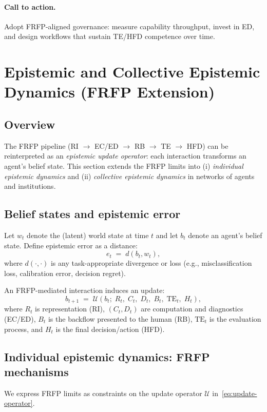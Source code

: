 \paragraph{Call to action.}
Adopt FRFP-aligned governance: measure capability throughput, invest in ED, and design workflows that sustain TE/HFD competence over time.
\section{Epistemic and Collective Epistemic Dynamics (FRFP Extension)}
\label{sec:epistemics}

\subsection{Overview}
The FRFP pipeline (RI $\rightarrow$ EC/ED $\rightarrow$ RB $\rightarrow$ TE $\rightarrow$ HFD) can be reinterpreted as an \emph{epistemic update operator}: each interaction transforms an agent's belief state. This section extends the FRFP limits into (i) \emph{individual epistemic dynamics} and (ii) \emph{collective epistemic dynamics} in networks of agents and institutions.

\subsection{Belief states and epistemic error}
Let $w_t$ denote the (latent) world state at time $t$ and let $b_t$ denote an agent's belief state.
Define epistemic error as a distance:
\begin{equation}
e_t \;=\; d(b_t, w_t),
\end{equation}
where $d(\cdot,\cdot)$ is any task-appropriate divergence or loss (e.g., misclassification loss, calibration error, decision regret).

An FRFP-mediated interaction induces an update:
\begin{equation}
b_{t+1} \;=\; \mathcal{U}\!\left(b_t;\; R_t,\; C_t,\; D_t,\; B_t,\; \text{TE}_t,\; H_t\right),
\label{eq:update-operator}
\end{equation}
where $R_t$ is representation (RI), $(C_t,D_t)$ are computation and diagnostics (EC/ED), $B_t$ is the backflow presented to the human (RB), $\text{TE}_t$ is the evaluation process, and $H_t$ is the final decision/action (HFD).

\subsection{Individual epistemic dynamics: FRFP mechanisms}
We express FRFP limits as constraints on the update operator $\mathcal{U}$ in~\eqref{eq:update-operator}.

